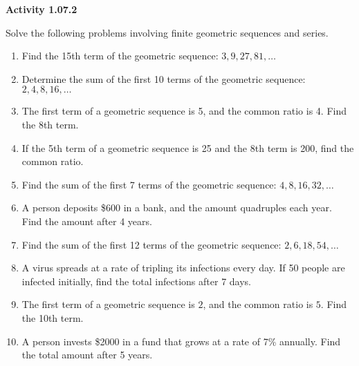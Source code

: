 \vspace{0.3ex}
\noindent\textbf{Activity 1.07.2}

\vspace{0.2ex}

Solve the following problems involving finite geometric sequences and series.
\begin{enumerate}
    \item Find the 15th term of the geometric sequence: \(3, 9, 27, 81, \dots\)
    \item Determine the sum of the first 10 terms of the geometric sequence: \(2, 4, 8, 16, \dots\)
    \item The first term of a geometric sequence is 5, and the common ratio is 4. Find the 8th term.
    \item If the 5th term of a geometric sequence is 25 and the 8th term is 200, find the common ratio.
    \item Find the sum of the first 7 terms of the geometric sequence: \(4, 8, 16, 32, \dots\)
    \item A person deposits \$600 in a bank, and the amount quadruples each year. Find the amount after 4 years.
    \item Find the sum of the first 12 terms of the geometric sequence: \(2, 6, 18, 54, \dots\)
    \item A virus spreads at a rate of tripling its infections every day. If 50 people are infected initially, find the total infections after 7 days.
    \item The first term of a geometric sequence is \(2\), and the common ratio is \(5\). Find the 10th term.
    \item A person invests \$2000 in a fund that grows at a rate of 7\% annually. Find the total amount after 5 years.
\end{enumerate}
